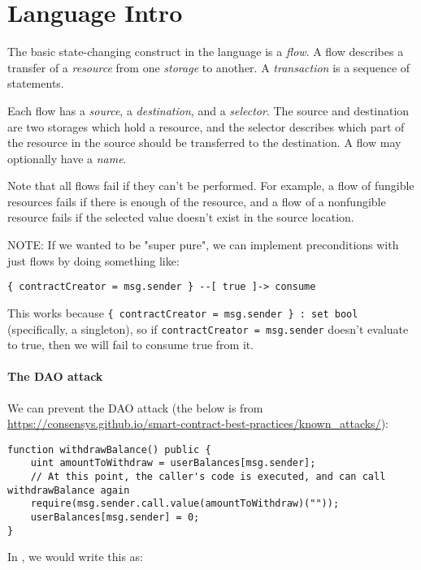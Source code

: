 \documentclass[10pt]{article}
\begin{document}
\section{Language Intro}

The basic state-changing construct in the language is a \emph{flow}.
A flow describes a transfer of a \emph{resource} from one \emph{storage} to another.
A \emph{transaction} is a sequence of statements.

Each flow has a \emph{source}, a \emph{destination}, and a \emph{selector}.
The source and destination are two storages which hold a resource, and the selector describes which part of the resource in the source should be transferred to the destination.
A flow may optionally have a \emph{name}.

Note that all flows fail if they can't be performed.
For example, a flow of fungible resources fails if there is enough of the resource, and a flow of a nonfungible resource fails if the selected value doesn't exist in the source location.

NOTE: If we wanted to be "super pure", we can implement preconditions with just flows by doing something like:
\begin{lstlisting}
{ contractCreator = msg.sender } --[ true ]-> consume
\end{lstlisting}
This works because \lstinline|{ contractCreator = msg.sender } : set bool| (specifically, a singleton), so if \lstinline{contractCreator = msg.sender} doesn't evaluate to true, then we will fail to consume true from it.

\paragraph{The DAO attack}
We can prevent the DAO attack (the below is from \url{https://consensys.github.io/smart-contract-best-practices/known_attacks/}):
\begin{lstlisting}
function withdrawBalance() public {
    uint amountToWithdraw = userBalances[msg.sender];
    // At this point, the caller's code is executed, and can call withdrawBalance again
    require(msg.sender.call.value(amountToWithdraw)(""));
    userBalances[msg.sender] = 0;
}
\end{lstlisting}

In \langName, we would write this as:
\end{document}
